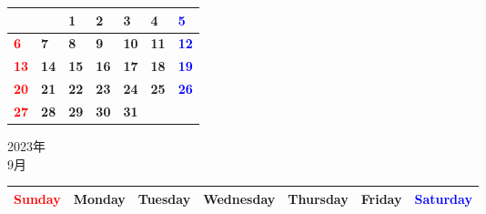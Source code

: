 \documentclass[a4paper,landscape]{jsarticle}
\newcommand{\dig}{\hspace{29mm}}
\newcommand{\tdig}{\hspace{27mm}}
\newcommand{\LBF}{\LARGE\textbf}
\begin{document}
\begingroup
\renewcommand{\arraystretch}{4}
\begin{tabular}{|p{32mm}|p{32mm}|p{32mm}|p{32mm}|p{32mm}|p{32mm}|p{32mm}|}
\hline
&&\raisebox{30pt} {\dig\LBF{1}}&\raisebox{30pt} {\dig\LBF{2}}&\raisebox{30pt} {\dig\LBF{3}}&\raisebox{30pt} {\dig\LBF{4}}&\raisebox{30pt} {\dig\textcolor{blue}{\LBF{5}}}\\
\hline
\raisebox{30pt} {\dig\textcolor{red}{\LBF{6}}}&\raisebox{30pt} {\dig\LBF{7}}&\raisebox{30pt} {\dig\LBF{8}}&\raisebox{30pt} {\dig\LBF{9}}&\raisebox{30pt} {\tdig\LBF{10}}&\raisebox{30pt} {\tdig\LBF{11}}&\raisebox{30pt} {\tdig\textcolor{blue}{\LBF{12}}}\\
\hline
\raisebox{30pt} {\tdig\textcolor{red}{\LBF{13}}}&\raisebox{30pt} {\tdig\LBF{14}}&\raisebox{30pt} {\tdig\LBF{15}}&\raisebox{30pt} {\tdig\LBF{16}}&\raisebox{30pt} {\tdig\LBF{17}}&\raisebox{30pt} {\tdig\LBF{18}}&\raisebox{30pt} {\tdig\textcolor{blue}{\LBF{19}}}\\
\hline
\raisebox{30pt} {\tdig\textcolor{red}{\LBF{20}}}&\raisebox{30pt} {\tdig\LBF{21}}&\raisebox{30pt} {\tdig\LBF{22}}&\raisebox{30pt} {\tdig\LBF{23}}&\raisebox{30pt} {\tdig\LBF{24}}&\raisebox{30pt} {\tdig\LBF{25}}&\raisebox{30pt} {\tdig\textcolor{blue}{\LBF{26}}}\\
\hline
\raisebox{30pt} {\tdig\textcolor{red}{\LBF{27}}}&\raisebox{30pt} {\tdig\LBF{28}}&\raisebox{30pt} {\tdig\LBF{29}}&\raisebox{30pt} {\tdig\LBF{30}}&\raisebox{30pt} {\tdig\LBF{31}}&&\\
\hline
\end{tabular}
\endgroup

\newpage

\begin{center}
	\LARGE 2023年\\
	\LARGE 9月
\end{center}

\begingroup
\renewcommand{\arraystretch}{1.4}
\begin{tabular}{|>{\centering\arraybackslash}p{32mm}|>{\centering\arraybackslash}p{32mm}|>{\centering\arraybackslash}p{32mm}|>{\centering\arraybackslash}p{32mm}|>{\centering\arraybackslash}p{32mm}|>{\centering\arraybackslash}p{32mm}|>{\centering\arraybackslash}p{32mm}|}
\hline
\textcolor{red}{\large Sunday}&\large Monday&\large Tuesday&\large Wednesday&\large Thursday&\large Friday&\textcolor{blue}{\large Saturday}\\
\hline
\end{tabular}
\endgroup
\end{document}
